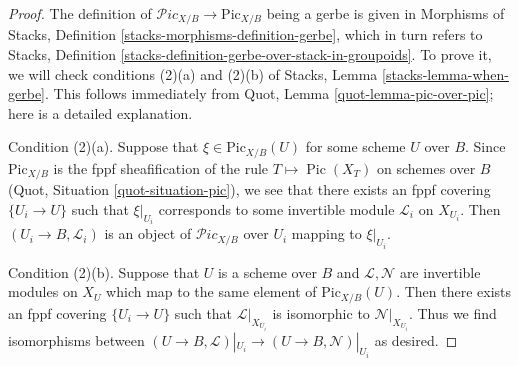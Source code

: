 \documentclass[10pt,a4paper]{amsart}
\theoremstyle{plain}
\theoremstyle{definition}
\theoremstyle{remark}
\numberwithin{equation}{subsection}
\def\Pic{\mathop{\mathrm{Pic}}\nolimits}
\def\Picardstack{\mathcal{P}\!\mathit{ic}}
\def\Picardfunctor{\mathrm{Pic}}
\begin{document}
\begin{proof}
The definition of $\Picardstack_{X/B} \to \Picardfunctor_{X/B}$ being
a gerbe is given in Morphisms of Stacks, Definition
\ref{stacks-morphisms-definition-gerbe}, which in turn refers to
Stacks, Definition \ref{stacks-definition-gerbe-over-stack-in-groupoids}.
To prove it, we will check conditions (2)(a) and (2)(b) of
Stacks, Lemma \ref{stacks-lemma-when-gerbe}. This follows immediately from
Quot, Lemma \ref{quot-lemma-pic-over-pic}; here is a detailed explanation.

\medskip\noindent
Condition (2)(a).
Suppose that $\xi \in \Picardfunctor_{X/B}(U)$ for some scheme $U$ over $B$.
Since $\Picardfunctor_{X/B}$ is the fppf sheafification of the rule
$T \mapsto \Pic(X_T)$ on schemes over $B$
(Quot, Situation \ref{quot-situation-pic}), we see that there exists an
fppf covering $\{U_i \to U\}$ such that $\xi|_{U_i}$ corresponds
to some invertible module $\mathcal{L}_i$ on $X_{U_i}$.
Then $(U_i \to B, \mathcal{L}_i)$ is an object of
$\Picardstack_{X/B}$ over $U_i$ mapping to $\xi|_{U_i}$.

\medskip\noindent
Condition (2)(b). Suppose that $U$ is a scheme over $B$ and
$\mathcal{L}, \mathcal{N}$ are invertible modules on $X_U$
which map to the same element of $\Picardfunctor_{X/B}(U)$.
Then there exists an fppf covering $\{U_i \to U\}$
such that $\mathcal{L}|_{X_{U_i}}$ is isomorphic to $\mathcal{N}|_{X_{U_i}}$.
Thus we find isomorphisms between
$(U \to B, \mathcal{L})|_{U_i} \to (U \to B, \mathcal{N})|_{U_i}$
as desired.
\end{proof}
\end{document}
